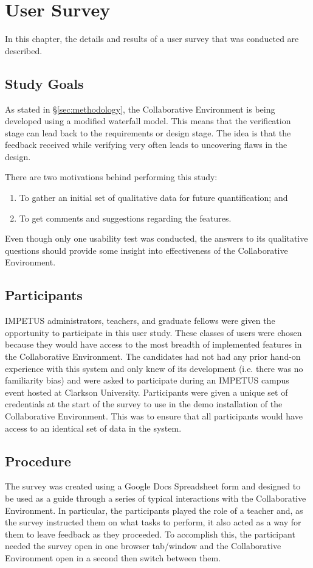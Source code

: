 \chapter{User Survey}
\label{chap:usability}

In this chapter, the details and results of a user survey that was conducted are described.

\section{Study Goals}
As stated in \S \ref{sec:methodology}, the Collaborative Environment is being developed using a modified waterfall model. This means that the verification stage can lead back to the requirements or design stage. The idea is that the feedback received while verifying very often leads to uncovering flaws in the design.

There are two motivations behind performing this study:
\begin{enumerate}
	\item To gather an initial set of qualitative data for future quantification; and
	\item To get comments and suggestions regarding the features.
\end{enumerate}

Even though only one usability test was conducted, the answers to its qualitative questions should provide some insight into effectiveness of the Collaborative Environment.

\section{Participants}
IMPETUS administrators, teachers, and graduate fellows were given the opportunity to participate in this user study. These classes of users were chosen because they would have access to the most breadth of implemented features in the Collaborative Environment. The candidates had not had any prior hand-on experience with this system and only knew of its development (i.e. there was no familiarity bias) and were asked to participate during an IMPETUS campus event hosted at Clarkson University. Participants were given a unique set of credentials at the start of the survey to use in the demo installation of the Collaborative Environment. This was to ensure that all participants would have access to an identical set of data in the system.

\section{Procedure}
The survey was created using a Google Docs Spreadsheet form and designed to be used as a guide through a series of typical interactions with the Collaborative Environment. In particular, the participants played the role of a teacher and, as the survey instructed them on what tasks to perform, it also acted as a way for them to leave feedback as they proceeded. To accomplish this, the participant needed the survey open in one browser tab/window and the Collaborative Environment open in a second then switch between them.

